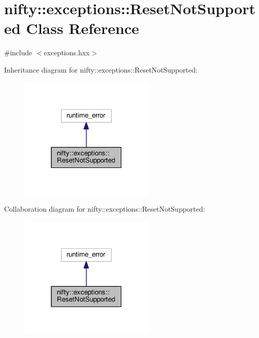 \hypertarget{classnifty_1_1exceptions_1_1ResetNotSupported}{}\section{nifty\+:\+:exceptions\+:\+:Reset\+Not\+Supported Class Reference}
\label{classnifty_1_1exceptions_1_1ResetNotSupported}


{\ttfamily \#include $<$exceptions.\+hxx$>$}



Inheritance diagram for nifty\+:\+:exceptions\+:\+:Reset\+Not\+Supported\+:\nopagebreak
\begin{figure}[H]
\begin{center}
\leavevmode
\includegraphics[width=183pt]{classnifty_1_1exceptions_1_1ResetNotSupported__inherit__graph}
\end{center}
\end{figure}


Collaboration diagram for nifty\+:\+:exceptions\+:\+:Reset\+Not\+Supported\+:\nopagebreak
\begin{figure}[H]
\begin{center}
\leavevmode
\includegraphics[width=183pt]{classnifty_1_1exceptions_1_1ResetNotSupported__coll__graph}
\end{center}
\end{figure}
